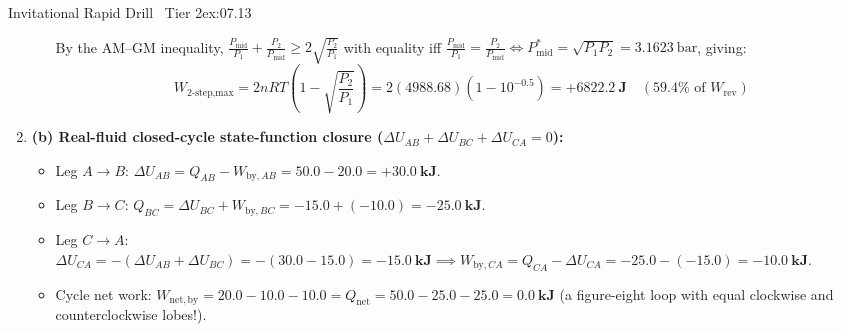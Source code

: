 \begin{workedexample}{Invitational Rapid Drill \textbar\ Tier 2}{ex:07.13}
\begin{enumerate}
\begin{itemize}
\[    \]
    By the AM--GM inequality, $\frac{P_{\mathrm{mid}}}{P_1} + \frac{P_2}{P_{\mathrm{mid}}} \ge 2\sqrt{\frac{P_2}{P_1}}$ with equality iff $\frac{P_{\mathrm{mid}}}{P_1} = \frac{P_2}{P_{\mathrm{mid}}} \iff \boxed{P_{\mathrm{mid}}^* = \sqrt{P_1 P_2}} = \SI{3.1623}{\bar}$, giving:
    \[
      W_{\text{2-step,max}} = 2nRT\left(1 - \sqrt{\frac{P_2}{P_1}}\right) = 2(4988.68)(1 - 10^{-0.5}) = \mathbf{+\SI{6822.2}{\joule}} \quad (59.4\%\text{ of } W_{\mathrm{rev}})
    \]
  \end{itemize}
  \item \textbf{(b) Real-fluid closed-cycle state-function closure ($\Delta U_{AB} + \Delta U_{BC} + \Delta U_{CA} = 0$):}
  \begin{itemize}
    \item Leg $A\to B$: $\Delta U_{AB} = Q_{AB} - W_{\mathrm{by},AB} = 50.0 - 20.0 = \mathbf{+\SI{30.0}{\kilo\joule}}$.
    \item Leg $B\to C$: $Q_{BC} = \Delta U_{BC} + W_{\mathrm{by},BC} = -15.0 + (-10.0) = \mathbf{\SI{-25.0}{\kilo\joule}}$.
    \item Leg $C\to A$: $\Delta U_{CA} = -(\Delta U_{AB} + \Delta U_{BC}) = -(30.0 - 15.0) = \mathbf{\SI{-15.0}{\kilo\joule}} \implies W_{\mathrm{by},CA} = Q_{CA} - \Delta U_{CA} = -25.0 - (-15.0) = \mathbf{\SI{-10.0}{\kilo\joule}}$.
    \item Cycle net work: $W_{\mathrm{net,by}} = 20.0 - 10.0 - 10.0 = Q_{\mathrm{net}} = 50.0 - 25.0 - 25.0 = \mathbf{\SI{0.0}{\kilo\joule}}$ (a figure-eight loop with equal clockwise and counterclockwise lobes!).
  \end{itemize}
\end{enumerate}
\end{workedexample}

